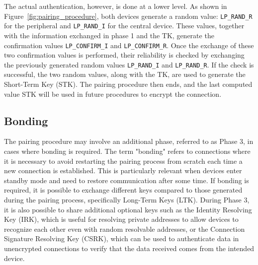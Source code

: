 \documentclass{Configuration_Files/PoliMi3i_thesis}
\begin{document}
The actual authentication, however, is done at a lower level. As shown in Figure~\ref{fig:pairing_procedure}, both devices generate a random value: \texttt{LP\_RAND\_R} for the peripheral and \texttt{LP\_RAND\_I} for the central device. These values, together with the information exchanged in phase 1 and the TK, generate the confirmation values \texttt{LP\_CONFIRM\_I} and \texttt{LP\_CONFIRM\_R}. Once the exchange of these two confirmation values is performed, their reliability is checked by exchanging the previously generated random values \texttt{LP\_RAND\_I} and \texttt{LP\_RAND\_R}. If the check is successful, the two random values, along with the TK, are used to generate the Short-Term Key (STK). The pairing procedure then ends, and the last computed value STK will be used in future procedures to encrypt the connection.

\subsection{Bonding}

The pairing procedure may involve an additional phase, referred to as Phase 3, in cases where bonding is required. The term "bonding" refers to connections where it is necessary to avoid restarting the pairing process from scratch each time a new connection is established. This is particularly relevant when devices enter standby mode and need to restore communication after some time. If bonding is required, it is possible to exchange different keys compared to those generated during the pairing process, specifically Long-Term Keys (LTK). During Phase 3, it is also possible to share additional optional keys such as the Identity Resolving Key (IRK), which is useful for resolving private addresses to allow devices to recognize each other even with random resolvable addresses, or the Connection Signature Resolving Key (CSRK), which can be used to authenticate data in unencrypted connections to verify that the data received comes from the intended device. 
\end{document}
